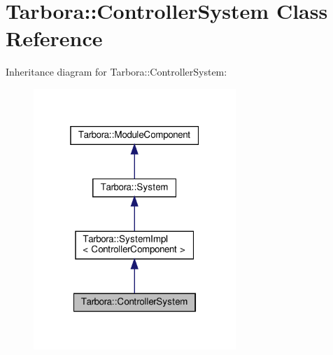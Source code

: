 \hypertarget{classTarbora_1_1ControllerSystem}{}\section{Tarbora\+:\+:Controller\+System Class Reference}
\label{classTarbora_1_1ControllerSystem}


Inheritance diagram for Tarbora\+:\+:Controller\+System\+:\nopagebreak
\begin{figure}[H]
\begin{center}
\leavevmode
\includegraphics[width=217pt]{classTarbora_1_1ControllerSystem__inherit__graph}
\end{center}
\end{figure}


